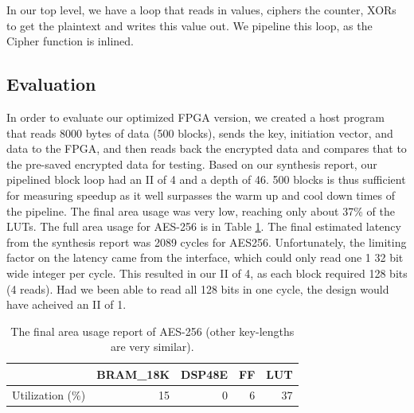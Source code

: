 In our top level, we have a loop that reads in values, ciphers the counter, XORs to get the plaintext and writes this value out. We pipeline this loop, as the Cipher function is inlined.

\subsection{Evaluation}
In order to evaluate our optimized FPGA version, we created a host program that reads 8000 bytes of data (500 blocks), sends the key, initiation vector, and data to the FPGA, and then reads back the encrypted data and compares that to the pre-saved encrypted data for testing. Based on our synthesis report, our pipelined block loop had an II of 4 and a depth of 46. 500 blocks is thus sufficient for measuring speedup as it well surpasses the warm up and cool down times of the pipeline. The final area usage was very low, reaching only about 37\% of the LUTs. The full area usage for AES-256 is in Table \ref{table:aesarea}. The final estimated latency from the synthesis report was 2089 cycles for AES256. Unfortunately, the limiting factor on the latency came from the interface, which could only read one 1 32 bit wide integer per cycle. This resulted in our II of 4, as each block required 128 bits (4 reads). Had we been able to read all 128 bits in one cycle, the design would have acheived an II of 1.

\begin{table}[h]
\begin{center}
\begin{tabular}{@{}r r r r r@{}}
\toprule
& BRAM\_18K &  DSP48E &   FF    &  LUT \\ \midrule
Utilization (\%)  &       15 &      0 &       6 &     37 \\ \bottomrule
\end{tabular}
\label{table:aesarea}
\caption{The final area usage report of AES-256 (other key-lengths are very similar).}
\end{center}
\end{table}

